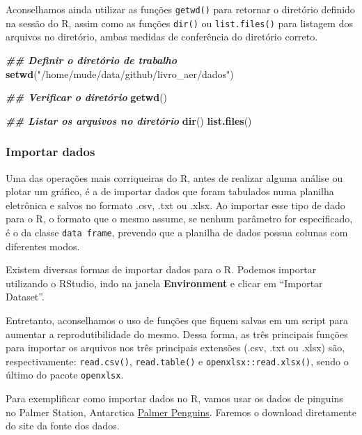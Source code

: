 \documentclass[
]{article}
\newenvironment{Shaded}{\begin{snugshade}}{\end{snugshade}}
\newcommand{\DocumentationTok}[1]{\textcolor[rgb]{0.56,0.35,0.01}{\textbf{\textit{#1}}}}
\newcommand{\FunctionTok}[1]{\textcolor[rgb]{0.13,0.29,0.53}{\textbf{#1}}}
\newcommand{\NormalTok}[1]{#1}
\newcommand{\StringTok}[1]{\textcolor[rgb]{0.31,0.60,0.02}{#1}}
\begin{document}
Aconselhamos ainda utilizar as funções \texttt{getwd()} para retornar o diretório definido na sessão do R, assim como as funções \texttt{dir()} ou \texttt{list.files()} para listagem dos arquivos no diretório, ambas medidas de conferência do diretório correto.

\begin{Shaded}
\begin{Highlighting}[]
\DocumentationTok{\#\# Definir o diretório de trabalho}
\FunctionTok{setwd}\NormalTok{(}\StringTok{"/home/mude/data/github/livro\_aer/dados"}\NormalTok{)}

\DocumentationTok{\#\# Verificar o diretório}
\FunctionTok{getwd}\NormalTok{()}

\DocumentationTok{\#\# Listar os arquivos no diretório}
\FunctionTok{dir}\NormalTok{()}
\FunctionTok{list.files}\NormalTok{()}
\end{Highlighting}
\end{Shaded}

\hypertarget{importar-dados}{%
\subsubsection{Importar dados}\label{importar-dados}}

Uma das operações mais corriqueiras do R, antes de realizar alguma análise ou plotar um gráfico, é a de importar dados que foram tabulados numa planilha eletrônica e salvos no formato .csv, .txt ou .xlsx. Ao importar esse tipo de dado para o R, o formato que o mesmo assume, se nenhum parâmetro for especificado, é o da classe \texttt{data\ frame}, prevendo que a planilha de dados possua colunas com diferentes modos.

Existem diversas formas de importar dados para o R. Podemos importar utilizando o RStudio, indo na janela \textbf{Environment} e clicar em ``Importar Dataset''.

Entretanto, aconselhamos o uso de funções que fiquem salvas em um script para aumentar a reprodutibilidade do mesmo. Dessa forma, as três principais funções para importar os arquivos nos três principais extensões (.csv, .txt ou .xlsx) são, respectivamente: \texttt{read.csv()}, \texttt{read.table()} e \texttt{openxlsx::read.xlsx()}, sendo o último do pacote \texttt{openxlsx}.

Para exemplificar como importar dados no R, vamos usar os dados de pinguins no Palmer Station, Antarctica \href{https://github.com/allisonhorst/palmerpenguins/tree/main}{Palmer Penguins}. Faremos o download diretamente do site da fonte dos dados.
\end{document}
